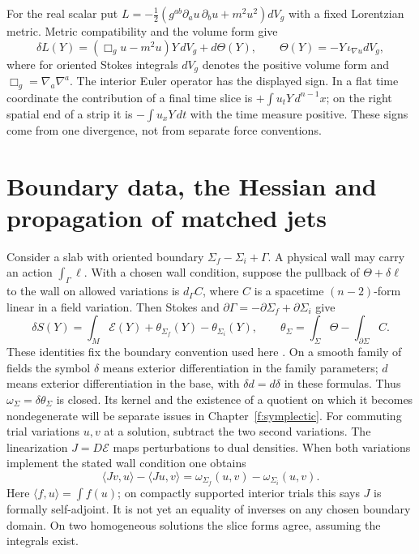 For the real scalar put $L=-\tfrac12(g^{ab}\partial_a u\,\partial_b u+m^2u^2)dV_g$ with a fixed Lorentzian metric. Metric compatibility and the volume form give
\[
 \delta L(Y)=(\Box_g u-m^2u)Y\,dV_g+d\Theta(Y),
 \qquad \Theta(Y)=-Y\,\iota_{\nabla u}dV_g ,
\]
where for oriented Stokes integrals $dV_g$ denotes the positive volume form and $\Box_g=\nabla_a\nabla^a$. The interior Euler operator has the displayed sign. In a flat time coordinate the contribution of a final time slice is $+\int u_tY\,d^{n-1}x$; on the right spatial end of a strip it is $-\int u_xY\,dt$ with the time measure positive. These signs come from one divergence, not from separate force conventions.

\section{Boundary data, the Hessian and propagation of matched jets}
Consider a slab with oriented boundary $\Sigma_f-\Sigma_i+\Gamma$. A physical wall may carry an action $\int_\Gamma\ell$. With a chosen wall condition, suppose the pullback of $\Theta+\delta\ell$ to the wall on allowed variations is $d_\Gamma C$, where $C$ is a spacetime $(n-2)$-form linear in a field variation. Then Stokes and $\partial\Gamma=-\partial\Sigma_f+\partial\Sigma_i$ give
\[
 \delta S(Y)=\int_M\mathcal E(Y)+\theta_{\Sigma_f}(Y)-\theta_{\Sigma_i}(Y),\qquad
 \theta_\Sigma=\int_\Sigma\Theta-\int_{\partial\Sigma} C .
\]
These identities fix the boundary convention used here \cite{HW}. On a smooth family of fields the symbol $\delta$ means exterior differentiation in the family parameters; $d$ means exterior differentiation in the base, with $\delta d=d\delta$ in these formulas. Thus $\omega_\Sigma=\delta\theta_\Sigma$ is closed. Its kernel and the existence of a quotient on which it becomes nondegenerate will be separate issues in Chapter~\ref{f:symplectic}. For commuting trial variations $u,v$ at a solution, subtract the two second variations. The linearization $J=D\mathcal E$ maps perturbations to dual densities. When both variations implement the stated wall condition one obtains
\begin{equation}
 \langle Jv,u\rangle-\langle Ju,v\rangle
   =\omega_{\Sigma_f}(u,v)-\omega_{\Sigma_i}(u,v) .\label{f:green-variation}
\end{equation}
Here $\langle f,u\rangle=\int f(u)$; on compactly supported interior trials this says $J$ is formally self-adjoint. It is not yet an equality of inverses on any chosen boundary domain. On two homogeneous solutions the slice forms agree, assuming the integrals exist.

